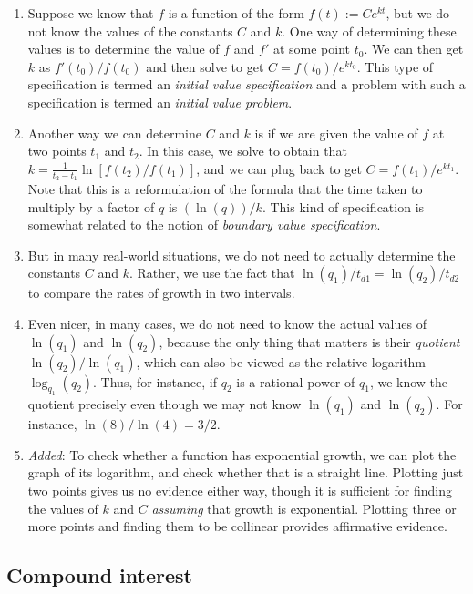 \documentclass[10pt]{amsart}
\begin{document}
\begin{enumerate}
\item Suppose we know that $f$ is a function of the form $f(t) :=
  Ce^{kt}$, but we do not know the values of the constants $C$ and
  $k$. One way of determining these values is to determine the value
  of $f$ and $f'$ at some point $t_0$. We can then get $k$ as
  $f'(t_0)/f(t_0)$ and then solve to get $C = f(t_0)/e^{kt_0}$. This
  type of specification is termed an {\em initial value specification}
  and a problem with such a specification is termed an {\em initial
  value problem}.
\item Another way we can determine $C$ and $k$ is if we are given the
  value of $f$ at two points $t_1$ and $t_2$. In this case, we solve
  to obtain that $k = \frac{1}{t_2 - t_1} \ln[f(t_2)/f(t_1)]$, and we
  can plug back to get $C = f(t_1)/e^{kt_1}$. Note that this is a
  reformulation of the formula that the time taken to multiply by a
  factor of $q$ is $(\ln(q))/k$. This kind of specification is
  somewhat related to the notion of {\em boundary value
  specification}.
\item But in many real-world situations, we do not need to actually
  determine the constants $C$ and $k$. Rather, we use the fact that
  $\ln(q_1)/t_{d1} =\ln(q_2)/t_{d2}$ to compare the rates of growth in
  two intervals.
\item Even nicer, in many cases, we do not need to know the actual
  values of $\ln(q_1)$ and $\ln(q_2)$, because the only thing that
  matters is their {\em quotient} $\ln(q_2)/\ln(q_1)$, which can also
  be viewed as the relative logarithm $\log_{q_1}(q_2)$. Thus, for
  instance, if $q_2$ is a rational power of $q_1$, we know the
  quotient precisely even though we may not know $\ln(q_1)$ and
  $\ln(q_2)$. For instance, $\ln(8)/\ln(4) = 3/2$.
\item {\em Added}: To check whether a function has exponential growth,
  we can plot the graph of its logarithm, and check whether that is a
  straight line. Plotting just two points gives us no evidence either
  way, though it is sufficient for finding the values of $k$ and $C$
  {\em assuming} that growth is exponential. Plotting three or more
  points and finding them to be collinear provides affirmative
  evidence.
\end{enumerate}

\subsection{Compound interest}
\end{document}
